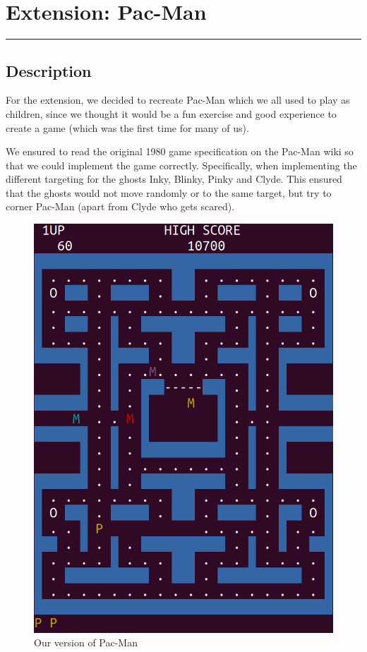 \documentclass{article}
\begin{document}
\clearpage

\section{Extension: Pac-Man}
\rule{\textwidth}{0.05em}
\vspace{0.1em}

\subsection{Description}
For the extension, we decided to recreate Pac-Man which we all used to play as children, since we thought it would be a fun exercise and good experience to create a game (which was the first time for many of us).  \\  \par \noindent
We ensured to read the original 1980 game specification on the Pac-Man wiki so that we could implement the game correctly. Specifically, when implementing the different targeting for the ghosts Inky, Blinky, Pinky and Clyde. This ensured that the ghosts would not move randomly or to the same target, but try to corner Pac-Man (apart from Clyde who gets scared).


\begin{figure}[h!]
\centering
\includegraphics[scale=0.4]{pacman.PNG}
\caption{Our version of Pac-Man}
\end{figure}
\end{document}
